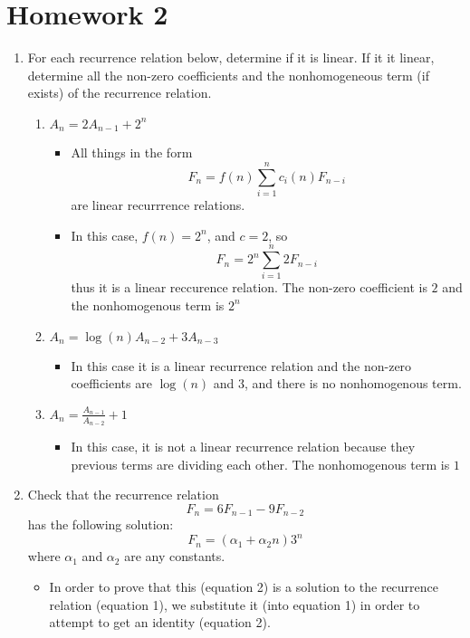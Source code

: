 
\section{Homework 2}
\begin{enumerate}
\item For each recurrence relation below, determine if it is linear. If it it linear, determine all the non-zero coefficients and the nonhomogeneous term (if exists) of the recurrence relation.
  \begin{enumerate}
  \item $A_{n}=2A_{n-1}+2^{n}$
    \begin{itemize}
    \item [] All things in the form $$F_{n}=f(n) \sum\limits_{i=1}^{n}c_{i}(n)F_{n-i}$$ are linear recurrrence relations.
    \item In this case, $f(n)=2^{n}$, and $c=2$, so $$F_{n}=2^{n} \sum\limits_{i=1}^{n}2F_{n-i}$$ thus it is a linear reccurence relation. The non-zero coefficient is $2$ and the nonhomogenous term is $2^{n}$
    \end{itemize}
  \item $A_{n}=\log{(n)}A_{n-2}+3A_{n-3}$
    \begin{itemize}
    \item In this case it is a linear recurrence relation and the non-zero coefficients are $\log{(n)}$ and $3$, and there is no nonhomogenous term.
    \end{itemize}
  \item {\Large $A_{n}=\frac{A_{n-1}}{A_{n-2}}+1$}
    \begin{itemize}
    \item In this case, it is not a linear recurrence relation because they previous terms are dividing each other. The nonhomogenous term is $1$
    \end{itemize}
  \end{enumerate}
\item Check that the recurrence relation
  \begin{equation}
  F_{n}=6F_{n-1}-9F_{n-2}
  \end{equation}
has the following solution:
  \begin{equation}
  F_{n}=(\alpha_{1}+\alpha_{2}n)3^{n}
  \end{equation}
where $\alpha_{1}$ and $\alpha_{2}$ are any constants.
  \begin{itemize}
  \item [] In order to prove that this (equation 2) is a solution to the recurrence relation (equation 1), we substitute it (into equation 1) in order to attempt to get an identity (equation 2).

\end{itemize}
\end{enumerate}
